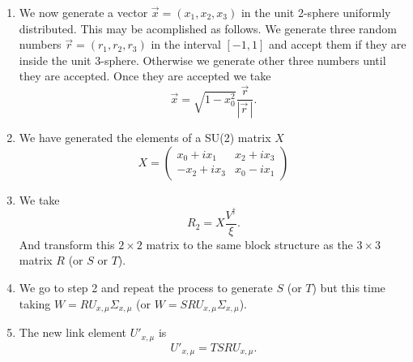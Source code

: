 \documentclass[12pt,a4paper]{article}
\begin{document}
\begin{enumerate}
	\item We now generate a vector $\vec{x} = (x_1,x_2,x_3)$ in the unit 2-sphere uniformly distributed. This may be acomplished as follows. We generate three random numbers $\vec{r} = (r_1,r_2,r_3)$ in the interval $[-1,1]$ and accept them if they are inside the unit 3-sphere. Otherwise we generate other three numbers until they are accepted. Once they are accepted we take
	\begin{equation}
		\vec{x} = \sqrt{1 - x_0^2} \frac{\vec{r}}{|\vec{r}\,|}.
	\end{equation}
	\item We have generated the elements of a SU(2) matrix $X$
	\begin{equation}
		X = \begin{pmatrix}
			x_0 + ix_1 & x_2 + ix_3 \\
		   -x_2 + ix_3 & x_0 - ix_1
		\end{pmatrix}
	\end{equation}
	\item We take
		\begin{equation}
			R_2 = X \frac{V^{\dagger}}{\xi}.
		\end{equation}
		And transform this $2\times 2$ matrix to the same block structure as the $3\times 3$ matrix $R$ (or $S$ or $T$).
		\item We go to step 2 and repeat the process to generate $S$ (or $T$) but this time taking $W = R U_{x,\mu}\Sigma_{x,\mu}$ (or $W = S R U_{x,\mu}\Sigma_{x,\mu}$).
	\item The new link element $U'_{x,\mu}$ is
	\begin{equation}
		U'_{x,\mu} = T S R U_{x,\mu}.
	\end{equation}			
\end{enumerate}
\end{document}
